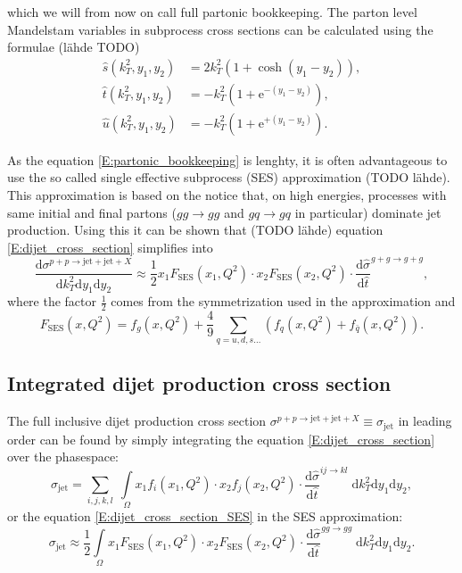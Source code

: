 \documentclass[a4paper, twoside, english, 12pt]{article}
\begin{document}
which we will from now on call full partonic bookkeeping. The parton level Mandelstam variables in subprocess cross sections can be calculated using the formulae (lähde TODO)
\begin{align}
\hat{s}(k_T^2,y_1,y_2) &= 2k_T^2(1+\cosh(y_1-y_2)), \label{E:Mandelstam_s}\\
\hat{t}(k_T^2,y_1,y_2) &= -k_T^2(1+\text{e}^{-(y_1-y_2)}),\label{E:Mandelstam_t}\\
\hat{u}(k_T^2,y_1,y_2) &=  -k_T^2(1+\text{e}^{+(y_1-y_2)}). \label{E:Mandelstam_u}
\end{align}

As the equation \eqref{E:partonic_bookkeeping} is lenghty, it is often advantageous to use the so called single effective subprocess (SES) approximation (TODO lähde). This approximation is based on the notice that, on high energies, processes with same initial and final partons ($gg\rightarrow gg$ and $gq\rightarrow gq$ in particular) dominate jet production. Using this it can be shown that (TODO lähde) equation \eqref{E:dijet_cross_section} simplifies into
\begin{equation}\label{E:dijet_cross_section_SES}
\frac{\text{d}\sigma^{p+p\rightarrow\text{jet}+\text{jet}+X}}{\text{d}k_T^2\text{d}y_1\text{d}y_2} \approx \frac{1}{2}x_1F_{\text{SES}}(x_1,Q^2)\cdot x_2F_{\text{SES}}(x_2,Q^2) \cdot\frac{\text{d}\hat{\sigma}}{\text{d}\hat{t}}^{g+g\rightarrow g+g},
\end{equation}
where the factor $\frac{1}{2}$ comes from the symmetrization used in the approximation and
\begin{equation}\label{E:F_SES}
	F_{\text{SES}}(x,Q^2) = f_g(x,Q^2) + \frac{4}{9} \sum\limits_{q=u,d,s\ldots }\left(f_q(x,Q^2)+f_{\bar{q}}(x,Q^2)\right).
\end{equation}

\subsection{Integrated dijet production cross section}

The full inclusive dijet production cross section $\sigma^{p+p\rightarrow\text{jet}+\text{jet}+X} \equiv \sigma_{\text{jet}}$ in leading order can be found by simply integrating the equation \eqref{E:dijet_cross_section} over the phasespace:
\begin{equation}\label{E:integrated_sigma_jet}
	\sigma_{\text{jet}} = \sum_{i,j,k,l}\;\int\limits_{\Omega} x_1f_i(x_1,Q^2)\cdot x_2f_j(x_2,Q^2) \cdot\frac{\text{d}\hat{\sigma}}{\text{d}\hat{t}}^{ij\rightarrow kl}\;\text{d}k_T^2\text{d}y_1\text{d}y_2 , 
\end{equation}
or the equation \eqref{E:dijet_cross_section_SES} in the SES approximation:
\begin{equation}\label{E:integrated_sigma_jet_SES}
\sigma_{\text{jet}} \approx \frac{1}{2}\int\limits_{\Omega} x_1F_{\text{SES}}(x_1,Q^2)\cdot x_2F_{\text{SES}}(x_2,Q^2) \cdot\frac{\text{d}\hat{\sigma}}{\text{d}\hat{t}}^{gg\rightarrow gg}\;\text{d}k_T^2\text{d}y_1\text{d}y_2 .
\end{equation}
\end{document}
